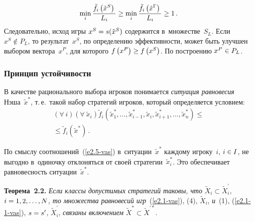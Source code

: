 \begin{multicols}{2}
\columnbreak

\noindent
$$
\min\limits_i \displaystyle\frac{\displaystyle \tilde{f}_i \left( \tilde{x}^S\right)\mathstrut}{\displaystyle L_i\mathstrut} \geq \min\limits_i
\displaystyle\frac{\displaystyle \tilde{f}_i\left( \tilde{x}^\Gamma\right)\mathstrut}{\displaystyle L_i\mathstrut} \geq 1\,.
$$
Следовательно, исход игры $x^S\hm =s(\tilde{x}^S)$ содержится в~множестве~$S_L$.
Если $x^S\not\in P_L$, то результат~$x^S$, по определению эффективности, может
быть улучшен выбором вектора~$x^P$, для которого $f\left( x^P\right) \hm\geq f\left(
x^S\right)$. По построению $x^P\hm\in P_L$.

    \subsubsection{Принцип устойчивости }

    В качестве рационального выбора игроков понимается \textit{ситуация
равновесия} Нэша~$\tilde{x}^*$, т.\,е.\ такой набор стратегий игроков, который
определяется условием:
\begin{multline}
(\forall\ i) (\forall\ \tilde{x}_i) \tilde{f}_i \left( \tilde{x}_1^*, \ldots ,  \tilde{x}^*_{i-1}, \tilde{x}_i,
\tilde{x}_{i+1}^*,\ldots , \tilde{x}^*_n\right) \leq{}\\
{}\leq \tilde{f}_i \left( \tilde{x}^*\right)\,.
\label{e2.5-vas}
\end{multline}

    По смыслу соотношений~(\ref{e2.5-vas}) в~ситуации~$\tilde{x}^*$ каж\-до\-му
игроку~$i$, $i\hm\in I$,  не выгодно в~одиночку отклоняться от своей
стратегии~$\tilde{x}^*_i$. Это обеспечивает равновесность ситуации~$\tilde{x}^*$.

    \smallskip

    \noindent
    \textbf{Теорема~2.2.} \textit{Если классы допустимых стратегий таковы, что
$\tilde{X}_i\subset \tilde{X}^{\prime}_i$, $i\hm=1,2,\ldots, N$, то множества
равновесий игр}~(\ref{e2.1-vas}), (4), $\tilde{X}_i$, \textit{и}~(1),
(\ref{e2.1-1-vas}),  $s\hm=s^\prime$,
$\tilde{X}_i^\prime$, \textit{связаны включением} $\tilde{X}^*\subset
    \tilde{X}^{\prime *}$.

    \smallskip


\end{multicols}
